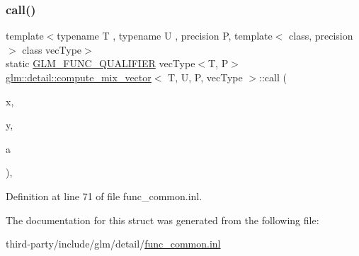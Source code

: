 \subsubsection{\texorpdfstring{call()}{call()}}
{\footnotesize\ttfamily template$<$typename T , typename U , precision P, template$<$ class, precision $>$ class vec\+Type$>$ \\
static \hyperlink{setup_8hpp_a33fdea6f91c5f834105f7415e2a64407}{G\+L\+M\+\_\+\+F\+U\+N\+C\+\_\+\+Q\+U\+A\+L\+I\+F\+I\+ER} vec\+Type$<$T, P$>$ \hyperlink{structglm_1_1detail_1_1compute__mix__vector}{glm\+::detail\+::compute\+\_\+mix\+\_\+vector}$<$ T, U, P, vec\+Type $>$\+::call (\begin{DoxyParamCaption}\item[{vec\+Type$<$ T, P $>$ const \&}]{x,  }\item[{vec\+Type$<$ T, P $>$ const \&}]{y,  }\item[{vec\+Type$<$ U, P $>$ const \&}]{a }\end{DoxyParamCaption})\hspace{0.3cm}{\ttfamily [inline]}, {\ttfamily [static]}}



Definition at line 71 of file func\+\_\+common.\+inl.



The documentation for this struct was generated from the following file\+:\begin{DoxyCompactItemize}
\item 
third-\/party/include/glm/detail/\hyperlink{func__common_8inl}{func\+\_\+common.\+inl}\end{DoxyCompactItemize}
